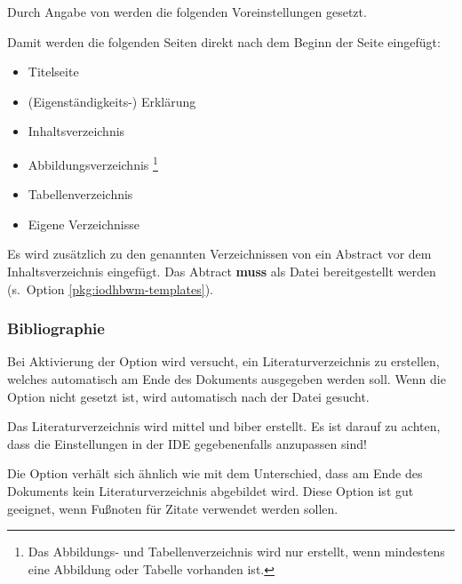 \documentclass[babel=ngerman,highlight=false]{skdoc}
\begin{document}
                Durch Angabe von  werden die folgenden Voreinstellungen gesetzt.
                \begin{sourcecode}
%
                \end{sourcecode}
                Damit werden die folgenden Seiten direkt nach dem Beginn der Seite eingefügt:
                \begin{itemize}
                    \item Titelseite
                    \item (Eigenständigkeits-) Erklärung
                    \item Inhaltsverzeichnis
                    \item Abbildungsverzeichnis \footnote{Das Abbildungs- und Tabellenverzeichnis wird nur erstellt, wenn mindestens eine Abbildung oder Tabelle vorhanden ist.}
                    \item Tabellenverzeichnis
                    \item Eigene Verzeichnisse
                \end{itemize}

                Es wird zusätzlich zu den genannten Verzeichnissen von  ein Abstract vor dem Inhaltsverzeichnis eingefügt. Das Abtract \textbf{muss} als Datei bereitgestellt werden (s.~Option  \ref{pkg:iodhbwm-templates}).

            \subsubsection{Bibliographie}
                Bei Aktivierung der Option wird versucht, ein Literaturverzeichnis zu erstellen, welches automatisch am Ende des Dokuments ausgegeben werden soll. Wenn die Option  nicht gesetzt ist, wird automatisch nach der Datei  gesucht.

                Das Literaturverzeichnis wird mittel  und biber erstellt. Es ist darauf zu achten, dass die Einstellungen in der IDE gegebenenfalls anzupassen sind!\medskip

                Die Option verhält sich ähnlich wie  mit dem Unterschied, dass am Ende des Dokuments kein Literaturverzeichnis abgebildet wird. Diese Option ist gut geeignet, wenn Fußnoten für Zitate verwendet werden sollen.\medskip
\end{document}
